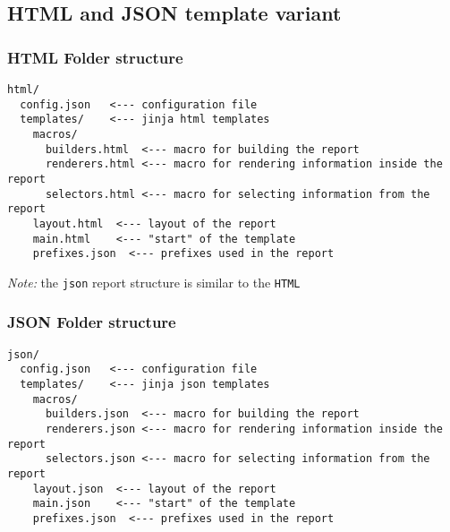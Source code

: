 \subsection{HTML and JSON template variant}
\subsubsection{HTML Folder structure}
\begin{lstlisting}
html/
  config.json   <--- configuration file
  templates/    <--- jinja html templates
    macros/
      builders.html  <--- macro for building the report
      renderers.html <--- macro for rendering information inside the report
      selectors.html <--- macro for selecting information from the report
    layout.html  <--- layout of the report
    main.html    <--- "start" of the template
    prefixes.json  <--- prefixes used in the report
\end{lstlisting}

\textit{Note:} the \texttt{json} report structure is similar to the \texttt{HTML}
\subsubsection{JSON Folder structure}
\begin{lstlisting}
json/
  config.json   <--- configuration file
  templates/    <--- jinja json templates
    macros/
      builders.json  <--- macro for building the report
      renderers.json <--- macro for rendering information inside the report
      selectors.json <--- macro for selecting information from the report
    layout.json  <--- layout of the report
    main.json    <--- "start" of the template
    prefixes.json  <--- prefixes used in the report
\end{lstlisting}